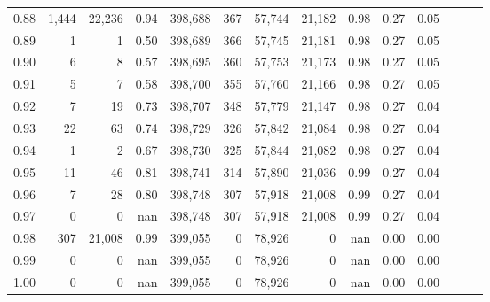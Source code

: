 \begin{tabular}{rrrrrrrrrrrrrr}
0.88 &   1,444 &  22,236 &  0.94 &  398,688 &      367 &  57,744 &  21,182 &  0.98 &  0.27 &      0.05 \\
0.89 &       1 &       1 &  0.50 &  398,689 &      366 &  57,745 &  21,181 &  0.98 &  0.27 &      0.05 \\
0.90 &       6 &       8 &  0.57 &  398,695 &      360 &  57,753 &  21,173 &  0.98 &  0.27 &      0.05 \\
0.91 &       5 &       7 &  0.58 &  398,700 &      355 &  57,760 &  21,166 &  0.98 &  0.27 &      0.05 \\
0.92 &       7 &      19 &  0.73 &  398,707 &      348 &  57,779 &  21,147 &  0.98 &  0.27 &      0.04 \\
0.93 &      22 &      63 &  0.74 &  398,729 &      326 &  57,842 &  21,084 &  0.98 &  0.27 &      0.04 \\
0.94 &       1 &       2 &  0.67 &  398,730 &      325 &  57,844 &  21,082 &  0.98 &  0.27 &      0.04 \\
0.95 &      11 &      46 &  0.81 &  398,741 &      314 &  57,890 &  21,036 &  0.99 &  0.27 &      0.04 \\
0.96 &       7 &      28 &  0.80 &  398,748 &      307 &  57,918 &  21,008 &  0.99 &  0.27 &      0.04 \\
0.97 &       0 &       0 &   nan &  398,748 &      307 &  57,918 &  21,008 &  0.99 &  0.27 &      0.04 \\
0.98 &     307 &  21,008 &  0.99 &  399,055 &        0 &  78,926 &       0 &   nan &  0.00 &      0.00 \\
0.99 &       0 &       0 &   nan &  399,055 &        0 &  78,926 &       0 &   nan &  0.00 &      0.00 \\
1.00 &       0 &       0 &   nan &  399,055 &        0 &  78,926 &       0 &   nan &  0.00 &      0.00 \\
\bottomrule
\end{tabular}
